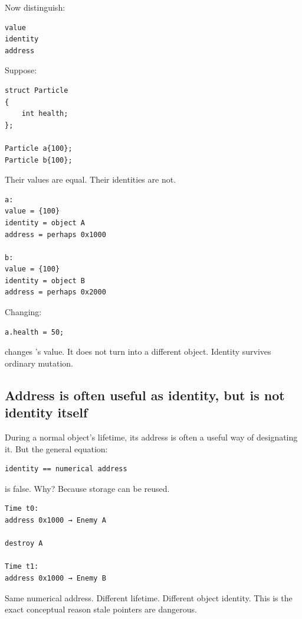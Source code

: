 Now distinguish:

\begin{verbatim}
value
identity
address
\end{verbatim}

Suppose:

\begin{verbatim}
struct Particle
{
    int health;
};

Particle a{100};
Particle b{100};
\end{verbatim}

Their values are equal. Their identities are not.

\begin{verbatim}
a:
value = {100}
identity = object A
address = perhaps 0x1000

b:
value = {100}
identity = object B
address = perhaps 0x2000
\end{verbatim}

Changing:

\begin{verbatim}
a.health = 50;
\end{verbatim}

changes 's value. It does not turn  into a different object. Identity survives ordinary mutation.

\subsection{Address is often useful as identity, but is not identity itself}\label{05-engine-i-ch002-address-is-often-useful-as-identity-but-is-not-identity-itself}

\hypertarget{05-engine-i-ch002-address-is-often-useful-as-identity-but-is-not-identity-itself}{}

During a normal object's lifetime, its address is often a useful way of designating it. But the general equation:

\begin{verbatim}
identity == numerical address
\end{verbatim}

is false. Why? Because storage can be reused.

\begin{verbatim}
Time t0:
address 0x1000 → Enemy A

destroy A

Time t1:
address 0x1000 → Enemy B
\end{verbatim}

Same numerical address. Different lifetime. Different object identity. This is the exact conceptual reason stale pointers are dangerous.

